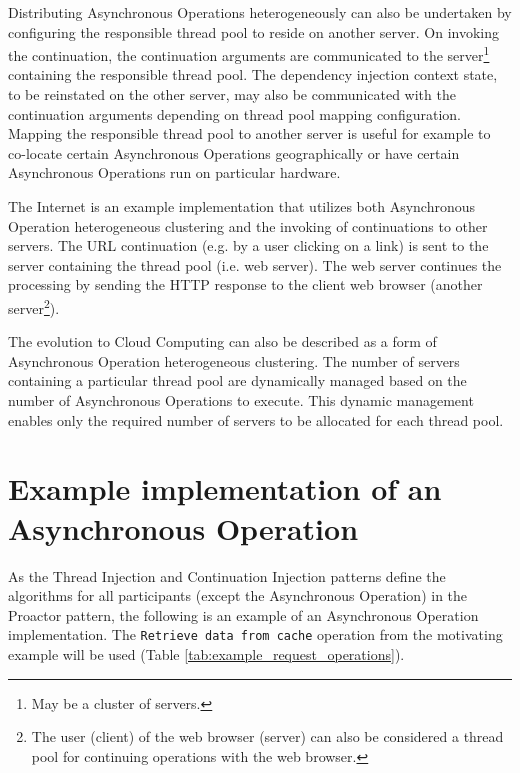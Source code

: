 \documentclass[prodmode]{style/acmlarge}
\begin{document}
Distributing Asynchronous Operations heterogeneously can also be undertaken by
configuring the responsible thread pool to reside on another server.  On
invoking the continuation, the continuation arguments are communicated to the
server\footnote{May be a cluster of servers.} containing the responsible thread
pool.  The dependency injection context state, to be reinstated on the other
server, may also be communicated with the continuation arguments depending on
thread pool mapping configuration.  Mapping the responsible thread pool to
another server is useful for example to co-locate certain Asynchronous
Operations geographically or have certain Asynchronous Operations run on
particular hardware.

The Internet is an example implementation that utilizes both Asynchronous
Operation heterogeneous clustering and the invoking of continuations to other
servers.  The URL continuation (e.g. by a user clicking on a link) is sent to
the server containing the thread pool (i.e. web server).  The web server
continues the processing by sending the HTTP response to the client web browser
(another server\footnote{The user (client) of the web browser (server) can also
be considered a thread pool for continuing operations with the web browser.}).

The evolution to Cloud Computing can also be described as a form of Asynchronous
Operation heterogeneous clustering.  The number of servers containing a
particular thread pool are dynamically managed based on the number of
Asynchronous Operations to execute.  This dynamic management enables only the
required number of servers to be allocated for each thread pool.


\section{Example implementation of an Asynchronous Operation}

As the Thread Injection and Continuation Injection patterns define the algorithms
for all participants (except the Asynchronous Operation) in the Proactor
pattern, the following is an example of an Asynchronous Operation
implementation.  The \texttt{Retrieve data from cache} operation from the
motivating example will be used (Table \ref{tab:example_request_operations}).
\end{document}
